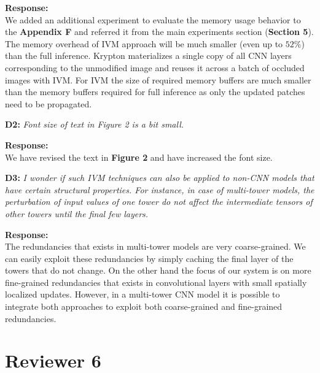 \documentclass[preprint]{vldb}
\begin{document}
\vspace{2mm}
\noindent \textbf{Response:}\\
We added an additional experiment to evaluate the memory usage behavior to the \textbf{Appendix F} and referred it from the main experiments section (\textbf{Section 5}).
The memory overhead of IVM approach will be much smaller (even up to $52\%$) than the full inference.
Krypton materializes a single copy of all CNN layers corresponding to the unmodified image and reuses it across a batch of occluded images with IVM. For IVM the size of required memory buffers are much smaller than the memory buffers required for full inference as only the updated patches need to be propagated.

\vspace{2mm}
\noindent \textbf{D2:} \textit{ Font size of text in Figure 2 is a bit small.}

\vspace{2mm}
\noindent \textbf{Response:}\\
We have revised the text in \textbf{Figure 2} and have increased the font size.

\vspace{2mm}
\noindent \textbf{D3:} \textit{I wonder if such IVM techniques can also be applied to non-CNN models that have certain structural properties. For instance, in case of multi-tower models, the perturbation of input values of one tower do not affect the intermediate tensors of other towers until the final few layers.}

\vspace{2mm}
\noindent \textbf{Response:}\\
The redundancies that exists in multi-tower models are very coarse-grained.
We can easily exploit these redundancies by simply caching the final layer of the towers that do not change.
On the other hand the focus of our system is on more fine-grained redundancies that exists in convolutional layers with small spatially localized updates.
However, in a multi-tower CNN model it is possible to integrate both approaches to exploit both coarse-grained and fine-grained redundancies.


\section{Reviewer 6}
\end{document}
